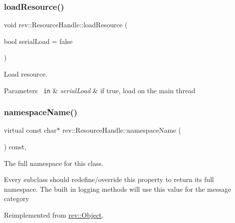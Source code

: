 \mbox{\label{classrev_1_1_resource_handle_acbbc923a430bb20c6b1fa56921b4f7f1}} 
\subsubsection{\texorpdfstring{loadResource()}{loadResource()}}
{\footnotesize\ttfamily void rev\+::\+Resource\+Handle\+::load\+Resource (\begin{DoxyParamCaption}\item[{bool}]{serial\+Load = {\ttfamily false} }\end{DoxyParamCaption})}



Load resource. 


\begin{DoxyParams}[1]{Parameters}
\mbox{\texttt{ in}}  & {\em serial\+Load} & if true, load on the main thread \\
\hline
\end{DoxyParams}
\mbox{\label{classrev_1_1_resource_handle_a99e4445225c5e56d17b1ecf7041b800c}} 
\subsubsection{\texorpdfstring{namespaceName()}{namespaceName()}}
{\footnotesize\ttfamily virtual const char$\ast$ rev\+::\+Resource\+Handle\+::namespace\+Name (\begin{DoxyParamCaption}{ }\end{DoxyParamCaption}) const\hspace{0.3cm}{\ttfamily [inline]}, {\ttfamily [virtual]}}



The full namespace for this class. 

Every subclass should redefine/override this property to return its full namespace. The built in logging methods will use this value for the message category 

Reimplemented from \mbox{\hyperlink{classrev_1_1_object_aaeb638d3e10f361c56c211a318a27f3d}{rev\+::\+Object}}.

